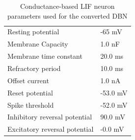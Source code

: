 \begin{table}[]
\caption{Conductance-based LIF neuron parameters used for the converted DBN}
\centering
\label{cobalifparam}
\begin{tabular}{|ll|}
\hline
Resting potential    			& -65 mV 		    \\
Membrane Capacity    			& 1.0 nF 		     \\
Membrane time constant    		& 20.0 ms		             \\
Refractory period     			& 10.0 ms		                 \\
Offset current    				& 1.0 nA		              \\
Reset potential     			& -53.0 mV 	               \\
Spike threshold     			& -52.0 mV          \\
Inhibitory reversal potential  & 90.0 mV	              \\
Excitatory reversal potential  & -0.0 mV 	               \\\hline
\end{tabular}
\end{table}
   
